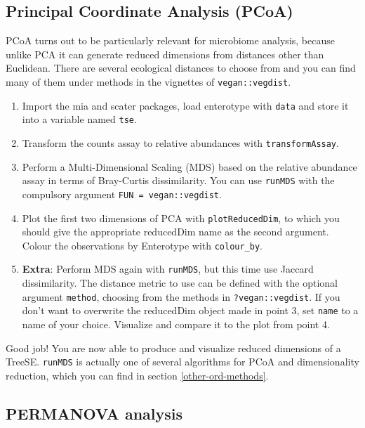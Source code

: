 \documentclass[
]{book}
\providecommand{\tightlist}{%
  \setlength{\itemsep}{0pt}\setlength{\parskip}{0pt}}
\begin{document}
\hypertarget{principal-coordinate-analysis-pcoa}{%
\subsection{Principal Coordinate Analysis (PCoA)}\label{principal-coordinate-analysis-pcoa}}

PCoA turns out to be particularly relevant for microbiome analysis, because
unlike PCA it can generate reduced dimensions from distances other than
Euclidean. There are several ecological distances to choose from and you can
find many of them under methods in the vignettes of \texttt{vegan::vegdist}.

\begin{enumerate}
\def\labelenumi{\arabic{enumi}.}
\tightlist
\item
  Import the mia and scater packages, load enterotype with \texttt{data} and store it
  into a variable named \texttt{tse}.
\item
  Transform the counts assay to relative abundances with \texttt{transformAssay}.
\item
  Perform a Multi-Dimensional Scaling (MDS) based on the relative abundance
  assay in terms of Bray-Curtis dissimilarity. You can use \texttt{runMDS} with the
  compulsory argument \texttt{FUN\ =\ vegan::vegdist}.
\item
  Plot the first two dimensions of PCA with \texttt{plotReducedDim}, to which you
  should give the appropriate reducedDim name as the second argument. Colour
  the observations by Enterotype with \texttt{colour\_by}.
\item
  \textbf{Extra}: Perform MDS again with \texttt{runMDS}, but this time use Jaccard
  dissimilarity. The distance metric to use can be defined with the optional
  argument \texttt{method}, choosing from the methods in \texttt{?vegan::vegdist}. If you
  don't want to overwrite the reducedDim object made in point 3, set \texttt{name} to
  a name of your choice. Visualize and compare it to the plot from point 4.
\end{enumerate}

Good job! You are now able to produce and visualize reduced dimensions of a
TreeSE. \texttt{runMDS} is actually one of several algorithms for PCoA and dimensionality
reduction, which you can find in section \ref{other-ord-methods}.

\hypertarget{permanova-analysis}{%
\subsection{PERMANOVA analysis}\label{permanova-analysis}}
\end{document}
